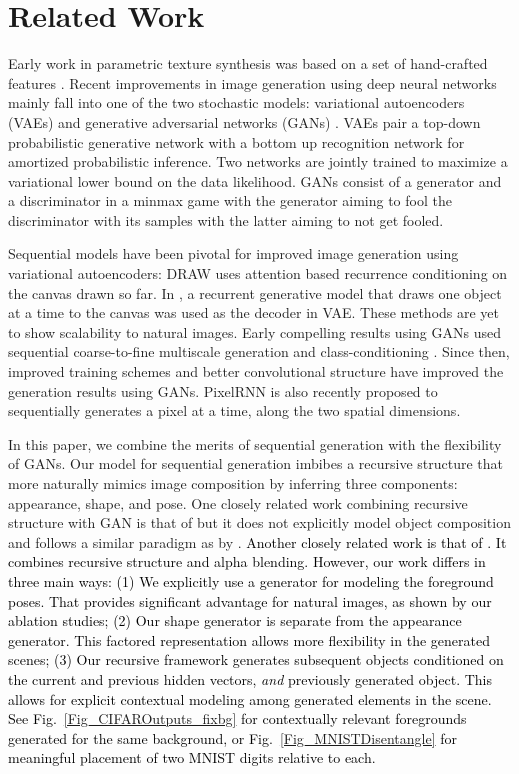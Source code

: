 \documentclass{article} \usepackage{iclr2017_conference,times}
\begin{document}
%
 
\section{Related Work}
\vspace*{-7pt}
Early work in parametric texture synthesis was based on a set of hand-crafted features \citep{portilla2000parametric}.  Recent improvements in image generation using deep neural networks mainly fall into one of the two stochastic models: variational autoencoders (VAEs) \citep{KSW+16} and generative adversarial networks (GANs) \citep{GAN}. VAEs pair a top-down probabilistic generative network with a bottom up recognition network for amortized probabilistic inference. Two networks are jointly trained to maximize a variational lower bound on the data likelihood. GANs consist of a generator and a discriminator in a minmax game with the generator aiming to fool the discriminator with its samples with the latter aiming to not get fooled.  

Sequential models have been pivotal for improved image generation using variational autoencoders: DRAW \citep{GDG+15} uses attention based recurrence conditioning on the canvas drawn so far. In \cite{EHWTKH16}, a recurrent generative model that draws one object at a time to the canvas was used as the decoder in VAE. These methods are yet to show scalability to natural images. Early compelling results using GANs used sequential coarse-to-fine multiscale generation and class-conditioning \citep{LAPGAN}. Since then, improved training schemes \citep{ImprovedGAN} and better convolutional structure \citep{DCGAN} have improved the generation results using GANs. PixelRNN \citep{pixelRNN} is also recently proposed to sequentially generates a pixel at a time, along the two spatial dimensions.

In this paper, we combine the merits of sequential generation with the flexibility of GANs. Our model for sequential generation imbibes a recursive structure that more naturally mimics image composition by inferring three components: appearance, shape, and pose. One closely related work combining recursive structure with GAN is that of \cite{GRAN} but it does not explicitly model object composition and follows a similar paradigm as by \cite{GDG+15}. \textcolor{black}{Another closely related work is that of \cite{CompositeGAN}. It combines recursive structure and alpha blending. However, our work differs in three main ways: (1) We explicitly use a generator for modeling the foreground poses. That provides significant advantage for natural images, as shown by our ablation studies; (2) Our shape generator is separate from the appearance generator. This factored representation allows more flexibility in the generated scenes; (3) Our recursive framework generates subsequent objects conditioned on the current and previous hidden vectors, \emph{and} previously generated object. This allows for explicit contextual modeling among generated elements in the scene. See Fig.~\ref{Fig_CIFAROutputs_fixbg} for contextually relevant foregrounds generated for the same background, or Fig.~\ref{Fig_MNISTDisentangle} for meaningful placement of two MNIST digits relative to each.}
\end{document}
